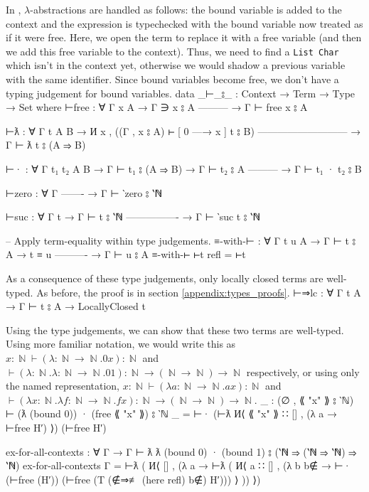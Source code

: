 \documentclass[logo,bsc,singlespacing,parskip,online]{infthesis}
\DeclareMathOperator{\nat}{\mathbb{N}}
\renewenvironment{code}{\mintedcopy[breaklines,breaksymbolleft=\;]{agda}}{\endmintedcopy}
\begin{document}
In \citet[chapter~Lambda]{wadler_programming_2022}, $\lambda$-abstractions are handled as follows:
the bound variable is added to the context and the expression is typechecked with the bound variable
now treated as if it were free. Here, we open the term to replace it with a free variable (and then
we add this free variable to the context). Thus, we need to find a \texttt{List Char} which isn't in
the context yet, otherwise we would shadow a previous variable with the same identifier. Since bound
variables become free, we don't have a typing judgement for bound variables.
\begin{code}
data _⊢_⦂_ : Context → Term → Type → Set where
  ⊢free : ∀ {Γ x A}
    → Γ ∋ x ⦂ A
      ---------
    → Γ ⊢ free x ⦂ A

  ⊢ƛ : ∀ {Γ t A B}
    → И x , ((Γ , x ⦂ A) ⊢ [ 0 —→ x ] t ⦂ B)
      ---------------------------
    → Γ ⊢ ƛ t ⦂ (A ⇒ B)

  ⊢· : ∀ {Γ t₁ t₂ A B}
    → Γ ⊢ t₁ ⦂ (A ⇒ B)
    → Γ ⊢ t₂ ⦂ A
      ---------
    → Γ ⊢ t₁ · t₂ ⦂ B

  ⊢zero : ∀ {Γ}
      -------
    → Γ ⊢ ‵zero ⦂ ‵ℕ

  ⊢suc : ∀ {Γ t}
    → Γ ⊢ t ⦂ ‵ℕ
      ----------------
    → Γ ⊢ ‵suc t ⦂ ‵ℕ

-- Apply term-equality within type judgements.
≡-with-⊢ : ∀ {Γ t u A}
  → Γ ⊢ t ⦂ A
  → t ≡ u
    ----------
  → Γ ⊢ u ⦂ A
≡-with-⊢ ⊢t refl = ⊢t
\end{code}

As a consequence of these type judgements, only locally closed terms are well-typed. As before, the
proof is in section \ref{appendix:types_proofs}.
\begin{code}
⊢⇒lc : ∀ {Γ t A} → Γ ⊢ t ⦂ A → LocallyClosed t
\end{code}

Using the type judgements, we can show that these two terms are well-typed. Using more familiar
notation, we would write this as $x \colon \nat \vdash (\lambda \colon \nat \to \nat. 0x) \colon \nat$
and $\vdash (\lambda \colon \nat. \lambda \colon \nat \to \nat. 01) \colon \nat \to (\nat
\to \nat) \to \nat$ respectively, or using only the named representation, $x \colon \nat \vdash
(\lambda a \colon \nat \to \nat. ax) \colon \nat$ and $\vdash (\lambda x \colon \nat. \lambda
f \colon \nat \to \nat. fx) \colon \nat \to (\nat \to \nat) \to \nat$.
\begin{code}
_ : (∅ , ⟪ "x" ⟫ ⦂ ‵ℕ) ⊢ (ƛ (bound 0)) · (free ⟪ "x" ⟫) ⦂ ‵ℕ
_ = ⊢· (⊢ƛ И⟨ ⟪ "x" ⟫ ∷ [] , (λ a → ⊢free H′) ⟩) (⊢free H′)

ex-for-all-contexts : ∀ {Γ} → Γ ⊢ ƛ ƛ (bound 0) · (bound 1) ⦂ (‵ℕ ⇒ (‵ℕ ⇒ ‵ℕ) ⇒ ‵ℕ)
ex-for-all-contexts {Γ} = ⊢ƛ (
  И⟨ [] , (λ a → ⊢ƛ (
    И⟨ a ∷ []
    , (λ b {b∉} → ⊢· (⊢free (H′)) (⊢free (T (∉⇒≢ (here refl) b∉) H′))) ⟩ )) ⟩)
\end{code}
\end{document}
